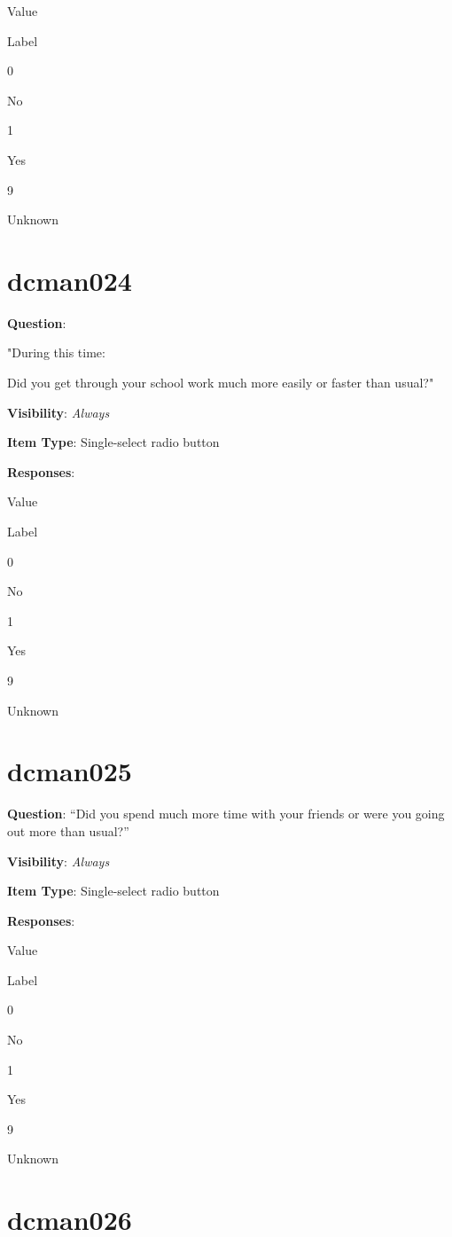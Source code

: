 \documentclass[]{book}
\begin{document}
Value

Label

0

No

1

Yes

9

Unknown

\hypertarget{dcman024}{%
\section{dcman024}\label{dcman024}}

\textbf{Question}:

"During this time:

Did you get through your school work much more easily or faster than usual?"

\textbf{Visibility}: \emph{Always}

\textbf{Item Type}: Single-select radio button

\textbf{Responses}:

Value

Label

0

No

1

Yes

9

Unknown

\hypertarget{dcman025}{%
\section{dcman025}\label{dcman025}}

\textbf{Question}: ``Did you spend much more time with your friends or were you going out more than usual?''

\textbf{Visibility}: \emph{Always}

\textbf{Item Type}: Single-select radio button

\textbf{Responses}:

Value

Label

0

No

1

Yes

9

Unknown

\hypertarget{dcman026}{%
\section{dcman026}\label{dcman026}}
\end{document}
